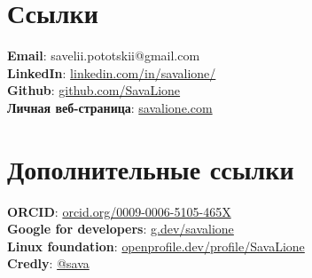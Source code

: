 \documentclass[a4paper,11pt]{article}
\begin{document}
\section{Ссылки}
\begin{itemize}[leftmargin=0.15in, label={}]
    \normalsize{\item{
                    \textbf{Email}{:  savelii.pototskii@gmail.com} \\
                    \textbf{LinkedIn}{:  \href{https://linkedin.com/in/savalione/}{linkedin.com/in/savalione/}} \\
                    \textbf{Github}{:  \href{https://github.com/SavaLione}{github.com/SavaLione}} \\
                    \textbf{Личная веб-страница}{: \href{https://savalione.com}{savalione.com} } \\
              }}
\end{itemize}

\section{Дополнительные ссылки}
\begin{itemize}[leftmargin=0.15in, label={}]
    \normalsize{\item{
                    \textbf{ORCID}{: \href{https://orcid.org/0009-0006-5105-465X}{orcid.org/0009-0006-5105-465X} } \\
                    \textbf{Google for developers}{: \href{https://g.dev/savalione}{g.dev/savalione} } \\
                    \textbf{Linux foundation}{: \href{https://openprofile.dev/profile/SavaLione}{openprofile.dev/profile/SavaLione} } \\
                    \textbf{Credly}{: \href{https://www.credly.com/users/sava}{@sava} } \\
              }}
\end{itemize}
\end{document}
